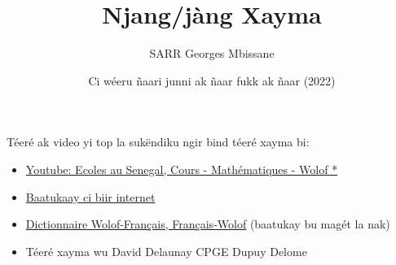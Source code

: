 \documentclass[twoside, a4paper]{article}
\title{ Njang/jàng Xayma}
\author{SARR Georges Mbissane}
\date{Ci wéeru ñaari junni ak ñaar fukk ak ñaar (2022)}
\begin{document}
\maketitle

Téeré ak video yi top la sukëndiku ngir bind téeré xayma bi:
\begin{itemize}
  \item \href{https://www.youtube.com/@ecolesausenegal/search?query=cours%20mathematiques%20wolof}{Youtube: Ecoles au Senegal, Cours - Mathématiques - Wolof *}
  \item \href{https://fr.glosbe.com/}{Baatukaay ci biir internet}
  \item \href{https://ia801303.us.archive.org/29/items/dictionnairesfra00holy/dictionnairesfra00holy.pdf}{Dictionnaire Wolof-Français, Français-Wolof} (baatukay bu magét la nak)
  \item Téeré xayma wu David Delaunay CPGE Dupuy Delome
\end{itemize}

\end{document}
